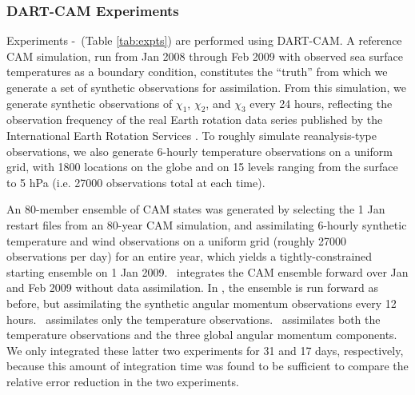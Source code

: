 

\subsubsection{DART-CAM Experiments}
Experiments \NODA-\ERPRST ~(Table \ref{tab:expts}) are performed using DART-CAM.  
A reference CAM simulation, run from Jan 2008 through Feb 2009 with observed sea surface temperatures as a boundary condition, constitutes the ``truth'' from which we generate a set of synthetic observations for assimilation. 
From this simulation, we generate synthetic observations of $\chi_1$, $\chi_2$, and $\chi_3$ every 24 hours, reflecting the observation frequency of the real Earth rotation data series published by the International Earth Rotation Services \citep{iers}.  
To roughly simulate reanalysis-type observations, we also generate 
6-hourly temperature observations on a uniform grid, with 1800 locations on the globe and on 15 levels ranging from the surface to 5 hPa (i.e. 27000 observations total at each time). 

An 80-member ensemble of CAM states was generated by selecting the 1 Jan restart files from an 80-year CAM simulation, and assimilating 6-hourly synthetic temperature and wind observations on a uniform grid (roughly 27000 observations per day) for an entire year, which yields a tightly-constrained starting ensemble on 1 Jan 2009.  
\NODA ~integrates the CAM ensemble forward over Jan and Feb 2009 without data assimilation. 
In \ERPALL, the ensemble is run forward as before, but assimilating the synthetic angular momentum observations every 12 hours.
\RST ~assimilates only the temperature observations.
\ERPRST ~assimilates both the temperature observations and the three global angular momentum components.
We only integrated these latter two experiments for 31 and 17 days, respectively, because this amount of integration time was found to be sufficient to compare the relative error reduction in the two experiments. 
